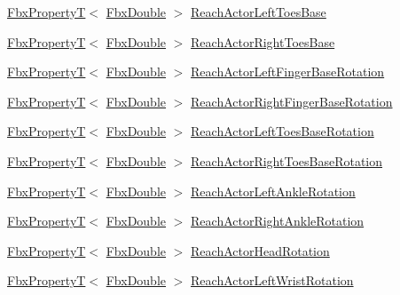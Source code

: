 \begin{DoxyCompactItemize}
\item 
\hyperlink{class_fbx_property_t}{Fbx\+PropertyT}$<$ \hyperlink{fbxtypes_8h_a171e72a1c46fc15c1a6c9c31948c1c5b}{Fbx\+Double} $>$ \hyperlink{class_fbx_character_abdd985dfc25db8c4ddcdfb3a447f920b}{Reach\+Actor\+Left\+Toes\+Base}
\item 
\hyperlink{class_fbx_property_t}{Fbx\+PropertyT}$<$ \hyperlink{fbxtypes_8h_a171e72a1c46fc15c1a6c9c31948c1c5b}{Fbx\+Double} $>$ \hyperlink{class_fbx_character_a837e3aeaad970205dea5a25bd4382c21}{Reach\+Actor\+Right\+Toes\+Base}
\item 
\hyperlink{class_fbx_property_t}{Fbx\+PropertyT}$<$ \hyperlink{fbxtypes_8h_a171e72a1c46fc15c1a6c9c31948c1c5b}{Fbx\+Double} $>$ \hyperlink{class_fbx_character_aab599341793dd4ed981f7150382d81f3}{Reach\+Actor\+Left\+Finger\+Base\+Rotation}
\item 
\hyperlink{class_fbx_property_t}{Fbx\+PropertyT}$<$ \hyperlink{fbxtypes_8h_a171e72a1c46fc15c1a6c9c31948c1c5b}{Fbx\+Double} $>$ \hyperlink{class_fbx_character_a30a72ece789a2f2bfb05d6d880864ead}{Reach\+Actor\+Right\+Finger\+Base\+Rotation}
\item 
\hyperlink{class_fbx_property_t}{Fbx\+PropertyT}$<$ \hyperlink{fbxtypes_8h_a171e72a1c46fc15c1a6c9c31948c1c5b}{Fbx\+Double} $>$ \hyperlink{class_fbx_character_a10ef759e4dbd99019568422aa692f16f}{Reach\+Actor\+Left\+Toes\+Base\+Rotation}
\item 
\hyperlink{class_fbx_property_t}{Fbx\+PropertyT}$<$ \hyperlink{fbxtypes_8h_a171e72a1c46fc15c1a6c9c31948c1c5b}{Fbx\+Double} $>$ \hyperlink{class_fbx_character_a04b250a928d03e2047b49640e07e051a}{Reach\+Actor\+Right\+Toes\+Base\+Rotation}
\item 
\hyperlink{class_fbx_property_t}{Fbx\+PropertyT}$<$ \hyperlink{fbxtypes_8h_a171e72a1c46fc15c1a6c9c31948c1c5b}{Fbx\+Double} $>$ \hyperlink{class_fbx_character_a3e43185f058a2357766a526f9fba362f}{Reach\+Actor\+Left\+Ankle\+Rotation}
\item 
\hyperlink{class_fbx_property_t}{Fbx\+PropertyT}$<$ \hyperlink{fbxtypes_8h_a171e72a1c46fc15c1a6c9c31948c1c5b}{Fbx\+Double} $>$ \hyperlink{class_fbx_character_aafb537afb1c75aac614feea168fbf5bb}{Reach\+Actor\+Right\+Ankle\+Rotation}
\item 
\hyperlink{class_fbx_property_t}{Fbx\+PropertyT}$<$ \hyperlink{fbxtypes_8h_a171e72a1c46fc15c1a6c9c31948c1c5b}{Fbx\+Double} $>$ \hyperlink{class_fbx_character_a91a5548a937b1b3892bb36cd6d6324ae}{Reach\+Actor\+Head\+Rotation}
\item 
\hyperlink{class_fbx_property_t}{Fbx\+PropertyT}$<$ \hyperlink{fbxtypes_8h_a171e72a1c46fc15c1a6c9c31948c1c5b}{Fbx\+Double} $>$ \hyperlink{class_fbx_character_ac011fdca558e2018ae4cb2209df328e2}{Reach\+Actor\+Left\+Wrist\+Rotation}

\end{DoxyCompactItemize}
